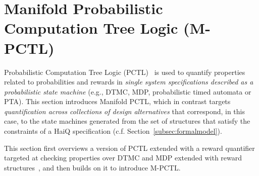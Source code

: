 \documentclass[10pt,journal,compsoc]{IEEEtran}
\begin{document}



\section{Manifold Probabilistic Computation Tree Logic (M-PCTL)}
\label{sec:mpctl}


Probabilistic Computation Tree Logic (PCTL)~\cite{Hansson1994} is used to quantify properties related to probabilities and rewards in {\it single system specifications described as a probabilistic state machine} (e.g., DTMC, MDP, probabilistic timed automata or PTA). 
This section introduces Manifold PCTL, which in contrast targets {\it quantification across collections of design alternatives} that correspond, in this case, to the state machines generated from the set of structures that satisfy the constraints of a {\sf HaiQ} specification (c.f. Section~\ref{subsec:formalmodel}).

This section first overviews a version of PCTL extended with a reward quantifier targeted at checking properties over DTMC and MDP extended with reward structures~\cite{DBLP:conf/formats/AndovaHK03}, and then builds on it to introduce M-PCTL.

\end{document}
